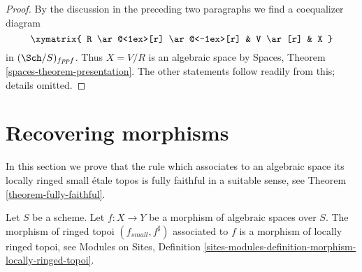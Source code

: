 \begin{proof}
\medskip\noindent
By the discussion in the preceding two paragraphs we find a
coequalizer diagram
$$
\xymatrix{
R \ar@<1ex>[r] \ar@<-1ex>[r] &
V \ar[r] &
X
}
$$
in $(\Sch/S)_{fppf}$. Thus $X = V/R$ is an algebraic space by
Spaces, Theorem \ref{spaces-theorem-presentation}.
The other statements follow readily from this; details omitted.
\end{proof}







\section{Recovering morphisms}
\label{section-morphisms}

\noindent
In this section we prove that the rule which associates to an algebraic space
its locally ringed small \'etale topos is fully faithful in a suitable
sense, see
Theorem \ref{theorem-fully-faithful}.

\begin{lemma}
\label{lemma-morphism-locally-ringed}
Let $S$ be a scheme.
Let $f : X \to Y$ be a morphism of algebraic spaces over $S$.
The morphism of ringed topoi $(f_{small}, f^\sharp)$
associated to $f$ is a morphism of locally ringed topoi, see
Modules on Sites,
Definition \ref{sites-modules-definition-morphism-locally-ringed-topoi}.
\end{lemma}

